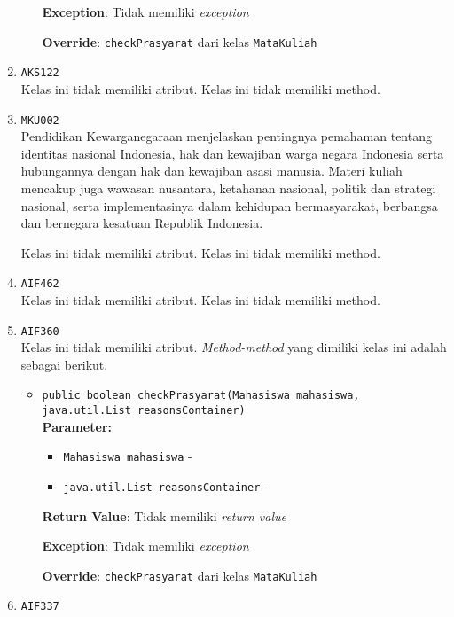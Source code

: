 \documentclass{article}
\begin{document}
\begin{enumerate}
\begin{itemize}
\textbf{Exception}: Tidak memiliki \textit{exception}

\textbf{Override}: \texttt{checkPrasyarat} dari kelas \texttt{MataKuliah}

\end{itemize}
\item \texttt{AKS122}\\ 


Kelas ini tidak memiliki atribut. Kelas ini tidak memiliki method. \item \texttt{MKU002}\\ 
Pendidikan Kewarganegaraan menjelaskan pentingnya pemahaman tentang identitas nasional 
 Indonesia, hak dan kewajiban warga negara Indonesia serta hubungannya dengan hak dan 
 kewajiban asasi manusia. Materi kuliah mencakup juga wawasan nusantara, ketahanan nasional, 
 politik dan strategi nasional, serta implementasinya dalam kehidupan bermasyarakat, berbangsa 
 dan bernegara kesatuan Republik Indonesia.

Kelas ini tidak memiliki atribut. Kelas ini tidak memiliki method. \item \texttt{AIF462}\\ 


Kelas ini tidak memiliki atribut. Kelas ini tidak memiliki method. \item \texttt{AIF360}\\ 


Kelas ini tidak memiliki atribut. \textit{Method-method} yang dimiliki kelas ini adalah sebagai berikut.
\begin{itemize}
\item \texttt{public boolean checkPrasyarat(Mahasiswa mahasiswa, java.util.List reasonsContainer)}\\ 


\textbf{Parameter:}\begin{itemize}
\item \texttt{Mahasiswa mahasiswa} - 
\item \texttt{java.util.List reasonsContainer} - 
\end{itemize}
\textbf{Return Value}: Tidak memiliki \textit{return value}

\textbf{Exception}: Tidak memiliki \textit{exception}

\textbf{Override}: \texttt{checkPrasyarat} dari kelas \texttt{MataKuliah}

\end{itemize}
\item \texttt{AIF337}\\ 



\end{enumerate}
\end{document}
